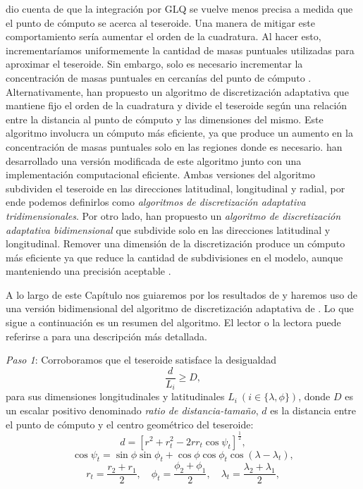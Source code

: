 \citet{ku1977} dio cuenta de que la integración por \ac{GLQ} se vuelve menos
precisa a medida que el punto de cómputo se acerca al teseroide.
Una manera de mitigar este comportamiento sería aumentar el orden de la
cuadratura.
Al hacer esto, incrementaríamos uniformemente la cantidad de masas puntuales
utilizadas para aproximar el teseroide.
Sin embargo, solo es necesario incrementar la concentración de masas puntuales
en cercanías del punto de cómputo \citep{uieda2016}.
Alternativamente,  \citet{li2011} han propuesto un algoritmo de discretización
adaptativa que mantiene fijo el orden de la cuadratura y divide el teseroide
según una relación entre la distancia al punto de cómputo y las dimensiones
del mismo.
Este algoritmo involucra un cómputo más eficiente, ya que produce un aumento en
la concentración de masas puntuales solo en las regiones donde es necesario.
\citet{uieda2016} han desarrollado una versión modificada de este
algoritmo junto con una implementación computacional eficiente.
Ambas versiones del algoritmo subdividen el teseroide en las direcciones
latitudinal, longitudinal y radial, por ende podemos definirlos como
\emph{algoritmos de discretización adaptativa tridimensionales}.
Por otro lado, \citet{lin2019} han propuesto un \emph{algoritmo de
discretización adaptativa bidimensional} que subdivide solo en las direcciones
latitudinal y longitudinal.
Remover una dimensión de la discretización produce un cómputo más eficiente ya
que reduce la cantidad de subdivisiones en el modelo, aunque manteniendo una
precisión aceptable \citep{lin2019}.

A lo largo de este Capítulo nos guiaremos por los resultados de \citet{lin2019}
y haremos uso de una versión bidimensional del algoritmo de discretización
adaptativa de \citet{uieda2016}.
Lo que sigue a continuación es un resumen del algoritmo. El lector o la lectora
puede referirse a \citet{uieda2016} para una descripción más detallada.

\textit{Paso 1}: Corroboramos que el teseroide satisface la
desigualdad
%
\begin{equation}
    \frac{d}{L_i} \geq D,
    \label{eq:condition}
\end{equation}
%
para sus dimensiones longitudinales y latitudinales
$L_i\ (i \in \{\lambda, \phi\})$,
donde $D$ es un escalar positivo denominado \emph{ratio de distancia-tamaño},
$d$ es la distancia entre el punto de cómputo y el centro geométrico del
teseroide:
%
\begin{equation}
    d = \left[
        r^2 + r_t^2 - 2 r r_t \cos\psi_t
        \right]^{\frac{1}{2}} ,
    \label{eq:distance}
\end{equation}
%
\begin{equation}
    \cos\psi_t =
        \sin\phi\sin\phi_t + \cos\phi\cos\phi_t\cos(\lambda - \lambda_t),
\end{equation}
%
\begin{equation}
    r_t = \frac{r_2 + r_1}{2}, \quad
    \phi_t = \frac{\phi_2 + \phi_1}{2}, \quad
    \lambda_t = \frac{\lambda_2 + \lambda_1}{2},
\end{equation}

